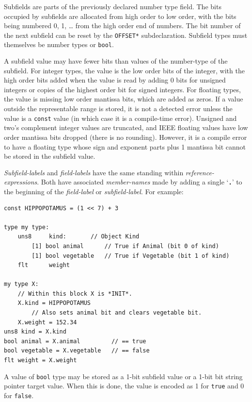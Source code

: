 \documentclass[12pt]{article}
\newcommand{\TT}[1]{{\tt \bfseries #1}}
\newenvironment{indpar}[1][0.3in]%
	{\begin{list}{}%
		     {\setlength{\itemsep}{0in}%
		      \setlength{\topsep}{0in}%
		      \setlength{\parsep}{1ex}%
		      \setlength{\labelwidth}{#1}%
		      \setlength{\leftmargin}{#1}%
		      \addtolength{\leftmargin}{\labelsep}}%
	 \item}%
	{\end{list}}
\begin{document}
Subfields are parts of the previously declared number type field.
The bits occupied by subfields are allocated from high order to low
order, with the bits being numbered
0, 1, \ldots{} from the high order end of numbers.
The bit number of the next subfield can be reset by the {\tt *OFFSET*}
subdeclaration.
Subfield types must themselves be number types or {\tt bool}.

A subfield value may have fewer bits than values of
the number-type of the subfield.
For integer types, the value is the low order bits of the integer, with
the high order bits added when the value is read by adding 0 bits
for unsigned integers or copies of the highest order bit for signed integers.
For floating types, the value is missing low order mantissa bits, which
are added as zeros.  If a value outside the representable range is stored,
it is not a detected error unless the value is a {\tt const} value (in which
case it is a compile-time error).
Unsigned and two's complement
integer values are truncated, and IEEE floating values
have low order mantissa bits dropped (there is no rounding).  However, it is
a compile error to have a floating type whose sign and exponent parts plus
1 mantissa bit cannot be stored in the subfield value.

{\em Subfield-labels} and {\em field-labels} have the same standing within
{\em reference-expressions}.
Both have associated {\em member-names} made by adding a single
`\TT{.}' to the beginning of the {\em field-label} or {\em subfield-label}.
For example:

\begin{indpar}\begin{verbatim}
const HIPPOPOTAMUS = (1 << 7) + 3

type my type:
    uns8     kind:       // Object Kind
        [1] bool animal      // True if Animal (bit 0 of kind)
        [1] bool vegetable   // True if Vegetable (bit 1 of kind)
    flt      weight

my type X:
    // Within this block X is *INIT*.
    X.kind = HIPPOPOTAMUS
        // Also sets animal bit and clears vegetable bit.
    X.weight = 152.34
uns8 kind = X.kind
bool animal = X.animal         // == true
bool vegetable = X.vegetable   // == false
flt weight = X.weight
\end{verbatim}\end{indpar}

A value of {\tt bool} type may be stored as a 1-bit subfield value
or a 1-bit bit string pointer target value.
When this is done, the value is encoded
as 1 for {\tt true} and 0 for {\tt false}.
\end{document}
